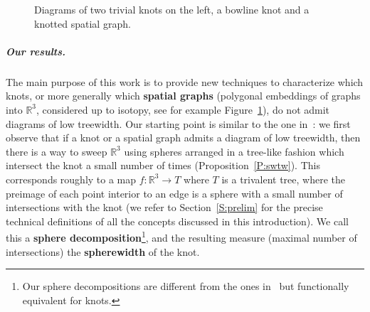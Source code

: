 \documentclass[11pt,a4paper]{article}
\newcommand{\control}[2]{ ($#2+#1$) .. #1}
\begin{document}
\begin{figure}[h]
\begin{center}
\caption{Diagrams of two trivial knots on the left, a bowline knot and a knotted spatial graph.}
\label{pic_knots_spatial}
\end{center}
\end{figure}


\subparagraph*{Our results.} The main purpose of this work is to provide new techniques to characterize which knots, or more generally which \textbf{spatial graphs} (polygonal embeddings of graphs into $\mathbb{R}^3$, considered up to isotopy, see for example Figure~\ref{pic_knots_spatial}), do not admit diagrams of low treewidth. Our starting point is similar to the one in~\cite{Mesmay_treewidth}: we first observe that if a knot or a spatial graph admits a diagram of low treewidth, then there is a way to sweep $\mathbb{R}^3$ using spheres arranged in a tree-like fashion which intersect the knot a small number of times (Proposition~\ref{P:swtw}). This corresponds roughly to a map $f: \mathbb{R}^3 \rightarrow T$ where $T$ is a trivalent tree, where the preimage of each point interior to an edge is a sphere with a small number of intersections with the knot (we refer to Section~\ref{S:prelim} for the precise technical definitions of all the concepts discussed in this introduction). We call this a \textbf{sphere decomposition}\footnote{Our sphere decompositions are different from the ones in~\cite{Mesmay_treewidth} but functionally equivalent for knots.}, and the resulting measure (maximal number of intersections) the \textbf{spherewidth} of the knot.
\end{document}
